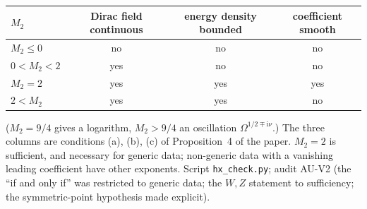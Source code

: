 \documentclass[11pt,a4paper]{article}
\newcommand{\ii}{\mathrm{i}}
\begin{document}
\begin{center}
\begin{tabular}{lccc}
\toprule
$M_{2}$ & Dirac field continuous & energy density bounded & coefficient smooth\\
\midrule
$M_{2}\le0$ & no & no & no\\
$0<M_{2}<2$ & yes & no & no\\
$M_{2}=2$ & yes & yes & yes\\
$2<M_{2}$ & yes & yes & no\\
\bottomrule
\end{tabular}
\end{center}
($M_{2}=9/4$ gives a logarithm, $M_{2}>9/4$ an oscillation $\Omega^{1/2\mp\ii\nu}$.) The three columns are conditions (a), (b), (c) of Proposition~4 of the paper. $M_{2}=2$ is sufficient, and necessary for generic data; non-generic data with a vanishing leading coefficient have other exponents. Script \texttt{hx\_check.py}; audit AU-V2 (the ``if and only if'' was restricted to generic data; the $W,Z$ statement to sufficiency; the symmetric-point hypothesis made explicit).
\end{document}
